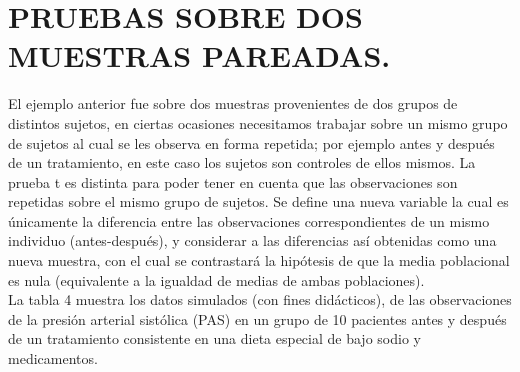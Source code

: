 \documentclass[12pt,letterpaper]{article}\usepackage[]{graphicx}\usepackage[]{color}
\begin{document}
\section{PRUEBAS SOBRE DOS MUESTRAS PAREADAS.}


El ejemplo anterior fue sobre dos muestras provenientes de dos grupos de distintos sujetos, en ciertas ocasiones necesitamos trabajar sobre un mismo grupo de sujetos al cual se les observa en forma repetida; por ejemplo antes y despu\'es de un tratamiento, en este caso los sujetos son controles de ellos mismos. La prueba t es distinta para poder tener en cuenta que las observaciones son repetidas sobre el mismo grupo de sujetos. Se define una nueva variable la cual es \'unicamente la diferencia entre las observaciones correspondientes de un mismo individuo (antes-despu\'es), y considerar a las diferencias as\'i obtenidas como una nueva muestra, con el cual se contrastar\'a la hip\'otesis de que la media poblacional es nula (equivalente a la igualdad de medias de ambas poblaciones).\\

La tabla 4 muestra los datos simulados (con fines did\'acticos), de las observaciones de la presi\'on arterial sist\'olica (PAS) en un grupo de 10 pacientes antes y despu\'es de un tratamiento consistente en una dieta especial de bajo sodio y medicamentos.\\
\end{document}
